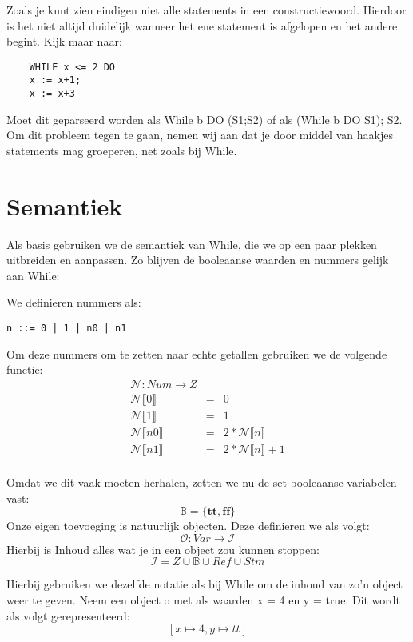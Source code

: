\documentclass[12pt]{article}
\begin{document}
Zoals je kunt zien eindigen niet alle statements in een constructiewoord. Hierdoor is het niet altijd duidelijk wanneer het ene statement is afgelopen en het andere begint. Kijk maar naar:
\begin{lstlisting}
	WHILE x <= 2 DO
	x := x+1;
	x := x+3
\end{lstlisting}
Moet dit geparseerd worden als While b DO (S1;S2) of als (While b DO S1); S2. Om dit probleem tegen te gaan, nemen wij aan dat je door middel van haakjes statements mag groeperen, net zoals bij While.
\pagebreak
\section{Semantiek}

Als basis gebruiken we de semantiek van While, die we op een paar plekken uitbreiden en aanpassen.
Zo blijven de booleaanse waarden en nummers gelijk aan While:

We definieren nummers als:
\begin{lstlisting}
n ::= 0 | 1 | n0 | n1
\end{lstlisting}

Om deze nummers om te zetten naar echte getallen gebruiken we de volgende functie:
$$
\begin{matrix}
\mathcal{N}: Num \rightarrow Z \\
\mathcal{N}\llbracket 0 \rrbracket &= &0  \\
\mathcal{N}\llbracket 1 \rrbracket &= &1 \\
\mathcal{N}\llbracket n0 \rrbracket &= &2 * \mathcal{N}\llbracket n \rrbracket \\
\mathcal{N}\llbracket n1 \rrbracket &= &2 * \mathcal{N}\llbracket n \rrbracket + 1 \\
\end{matrix}
$$

Omdat we dit vaak moeten herhalen, zetten we nu de set booleaanse variabelen vast:
$$ \mathds{B} = \{\boldsymbol{tt},\boldsymbol{ff}\} $$
Onze eigen toevoeging is natuurlijk objecten. Deze definieren we als volgt:
$$\mathcal{O} : Var \rightarrow \mathcal{I}$$ 
Hierbij is Inhoud alles wat je in een object zou kunnen stoppen: 
$$\mathcal{I} = Z \cup \mathds{B} \cup Ref \cup Stm$$ 

Hierbij gebruiken we dezelfde notatie als bij While om de inhoud van zo'n object weer te geven.
Neem een object o met als waarden x = 4 en y = true. Dit wordt als volgt gerepresenteerd:
$$[x \mapsto 4, y \mapsto tt]$$
\end{document}
